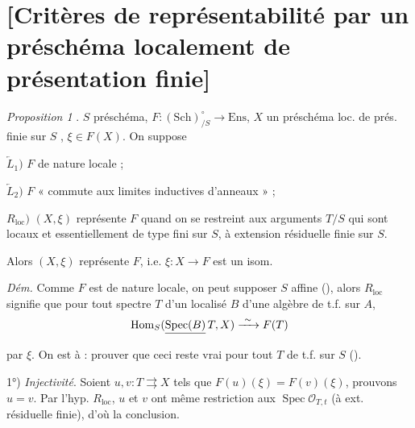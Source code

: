 \documentclass[11pt,a4paper]{article}
\begin{document}
\section{[Critères de représentabilité par un préschéma localement de présentation finie]}


\emph{Proposition 1} . $S$ préschéma,
$F : (\mathrm{Sch})^{\circ}_{/S} \to \mathrm{Ens}$, $X$ un préschéma loc. de
prés. finie sur $S$ ,
$\xi \in F(X)$. On suppose

$\underleftarrow{L}_1)$ $F$ de nature locale ;

$\underleftarrow{L}_2)$ $F$ « commute aux limites inductives d'anneaux » ;

$R_{\mathrm{loc}})$ $(X, \xi)$ représente $F$ quand on se restreint aux
arguments $T/S$ qui sont  locaux et essentiellement de
type fini sur $S$, à extension résiduelle finie sur $S$.

Alors $(X, \xi)$ représente $F$, i.e. $\xi : X \to F$ est un isom.

\emph{Dém.} Comme $F$ est de nature locale, on peut supposer $S$ affine
(\ill{}), alors $R_{\mathrm{loc}}$ signifie que pour tout spectre $T$ d'un
localisé $B$ d'une algèbre de t.f. sur  $A$,
\[
  \operatorname{Hom}_S(\struck{\operatorname{Spec}(B)}\, T, X)
  \xrightarrow{\ \sim\ } F(T)
\]
par $\xi$. \struck{\ill{}} On est  à : prouver que ceci
reste vrai pour tout $T$  de t.f. sur $S$ (\ill{}).

1°) \emph{Injectivité}. Soient $u, v : T \rightrightarrows X$
 tels que $F(u)(\xi) = F(v)(\xi)$, prouvons $u = v$. Par
l'hyp. $R_{\mathrm{loc}}$, $u$ et $v$ ont même restriction aux
$\operatorname{Spec} \mathcal{O}_{T,t}$ (à ext. résiduelle finie), d'où la
conclusion.
\end{document}
